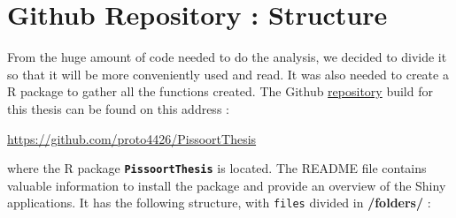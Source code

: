 \chapter{Github Repository : Structure}\label{appgit}

From the huge amount of code needed to do the analysis, we decided to divide it so that it will be more conveniently used and read. It was also needed to create a R package to gather all the functions created.
The Github \href{https://github.com/proto4426/PissoortThesis/}{repository} build for this thesis can be found on this address :

\begin{center}
\url{https://github.com/proto4426/PissoortThesis}
\end{center}
where the R package \textbf{\texttt{PissoortThesis}} is located. The README file contains valuable information to install the package and provide an overview of the Shiny applications. It has the following structure, with \texttt{files} divided in \textbf{/folders/} : 

